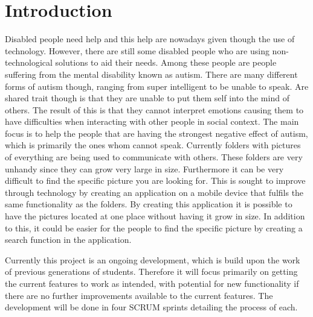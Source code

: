 \chapter{Introduction}

Disabled people need help and this help are nowadays given though the use of technology.
However, there are still some disabled people who are using non-technological solutions to aid their needs.
Among these people are people suffering from the mental disability known as autism.
There are many different forms of autism though, ranging from super intelligent to be unable to speak.
Are shared trait though is that they are unable to put them self into the mind of others.
The result of this is that they cannot interpret emotions causing them to have difficulties when interacting with other people in social context.
The main focus is to help the people that are having the strongest negative effect of autism, which is primarily the ones whom cannot speak.
Currently folders with pictures of everything are being used to communicate with others.
These folders are very unhandy since they can grow very large in size.
Furthermore it can be very difficult to find the specific picture you are looking for.
This is sought to improve through technology by creating an application on a mobile device that fulfils the same functionality as the folders.
By creating this application it is possible to have the pictures located at one place without having it grow in size.
In addition to this, it could be easier for the people to find the specific picture by creating a search function in the application.

Currently this project is an ongoing development, which is build upon the work of previous generations of students.
Therefore it will focus primarily on getting the current features to work as intended, with potential for new functionality if there are no further improvements available to the current features.
The development will be done in four SCRUM sprints detailing the process of each.